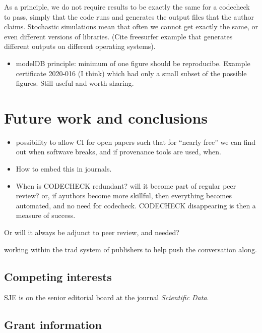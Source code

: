 \documentclass[12pt]{article}
\begin{document}
As a principle, we do not require results to be exactly the same for a
codecheck to pass, simply that the code runs and generates the output
files that the author claims. Stochastic simulations mean that often
we cannot get exactly the same, or even different versions of
libraries.  (Cite freesurfer example \cite{Gronenschild2012-pp} that
generates different outputs on different operating systems).

\begin{itemize}
\item modelDB principle: minimum of one figure should be reproducibe.
  Example certificate 2020-016 (I think) which had only a small subset
  of the possible figures. Still useful and worth sharing.
\end{itemize}

\section*{Future work and conclusions}\label{future-work-and-conclusions}

\begin{itemize}
\item
  possibility to allow CI for open papers such that for ``nearly free''
  we can find out when softwave breaks, and if provenance tools are
  used, when.
\item
  How to embed this in journals.
\item
  When is CODECHECK redundant? will it become part of regular peer
  review? or, if ayuthors become more skillful, then everything becomes
  automated, and no need for codecheck. CODECHECK disappearing is then a
  measure of success.
\end{itemize}

Or will it always be adjunct to peer review, and needed?

working within the trad system of publishers to help push the
conversation along.




\subsection*{Competing interests}

SJE is on the senior editorial board at the journal \emph{Scientific
Data}.

\subsection*{Grant information}
\end{document}
